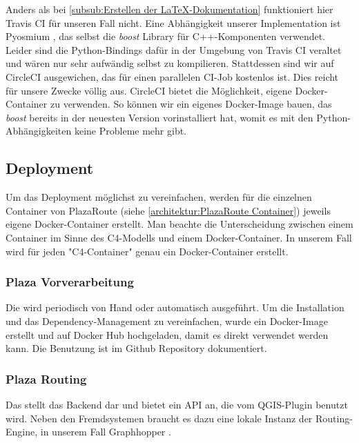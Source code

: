 Anders als bei \ref{subsub:Erstellen der LaTeX-Dokumentation} funktioniert hier Travis CI für unseren Fall nicht. Eine Abhängigkeit unserer Implementation ist Pyosmium \cite{pyosmium}, das selbst die \emph{boost} Library für C++-Komponenten verwendet. Leider sind die Python-Bindings dafür in der Umgebung von Travis CI veraltet und wären nur sehr aufwändig selbst zu kompilieren. Stattdessen sind wir auf CircleCI \cite{circleci} ausgewichen, das für einen parallelen \ac{CI}-Job kostenlos ist. Dies reicht für unsere Zwecke völlig aus. CircleCI bietet die Möglichkeit, eigene Docker-Container zu verwenden. So können wir ein eigenes Docker-Image bauen, das \emph{boost} bereits in der neuesten Version vorinstalliert hat, womit es mit den Python-Abhängigkeiten keine Probleme mehr gibt.

\subsection{Deployment}
\label{sub:Deployment}

Um das Deployment möglichst zu vereinfachen, werden für die einzelnen Container von PlazaRoute (siehe \ref{architektur:PlazaRoute Container}) jeweils eigene Docker-Container erstellt. Man beachte die Unterscheidung zwischen einem Container im Sinne des C4-Modells \cite{c4model} und einem Docker-Container. In unserem Fall wird für jeden "C4-Container" genau ein Docker-Container erstellt.

\subsubsection{Plaza Vorverarbeitung}
\label{deployment:Plaza Vorverarbeitung}

Die  wird periodisch von Hand oder automatisch ausgeführt. Um die Installation und das Dependency-Management zu vereinfachen, wurde ein Docker-Image erstellt und auf Docker Hub \cite{dockerhub:plazaroute} hochgeladen, damit es direkt verwendet werden kann. Die Benutzung ist im Github Repository \cite{github:PlazaRoute} dokumentiert.

\subsubsection{Plaza Routing}
\label{deployment:Plaza Routing}

Das  stellt das Backend dar und bietet ein API an, die vom QGIS-Plugin benutzt wird. Neben den Fremdsystemen braucht es dazu eine lokale Instanz der Routing-Engine, in unserem Fall Graphhopper \cite{graphhopper}.

